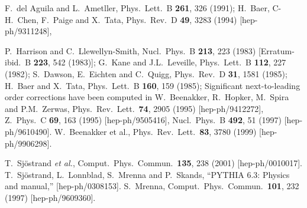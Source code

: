\documentclass[12pt]{article}
\begin{document}
\begin{thebibliography}{999}
F.~del Aguila and L.~Ametller,
  Phys.\ Lett.\ B {\bf 261}, 326 (1991);
H.~Baer, C-H.~Chen, F.~Paige and X.~Tata, 
  Phys.\ Rev.\ D {\bf 49}, 3283 (1994)
  [hep-ph/9311248],

P.~Harrison and C.~Llewellyn-Smith,
  Nucl.\ Phys.\ B {\bf 213}, 223 (1983)
  [Erratum-ibid.\ B {\bf 223}, 542 (1983)];
G.~Kane and J.L.~Leveille,
  Phys.\ Lett.\ B {\bf 112}, 227 (1982);
S.~Dawson, E.~Eichten and C.~Quigg,
  Phys.\ Rev.\ D {\bf 31}, 1581 (1985);
H.~Baer and X.~Tata, 
  Phys.\ Lett.\ B {\bf 160}, 159 (1985);
Significant next-to-leading order corrections have been computed in 
W.~Beenakker, R.~Hopker, M.~Spira and P.M.~Zerwas,
  Phys.\ Rev.\ Lett.\  {\bf 74}, 2905 (1995)
  [hep-ph/9412272],
  Z.\ Phys.\ C {\bf 69}, 163 (1995)
  [hep-ph/9505416],
  Nucl.\ Phys.\ B {\bf 492}, 51 (1997)
  [hep-ph/9610490].
W.~Beenakker et al.,
  Phys.\ Rev.\ Lett.\  {\bf 83}, 3780 (1999)
  [hep-ph/9906298].

T.~Sj\"ostrand {\em et al.}, 
  Comput.\ Phys.\ Commun.\  {\bf 135}, 238 (2001)
  [hep-ph/0010017].
T.~Sj\"ostrand, L.~Lonnblad, S.~Mrenna and P.~Skands,
  ``PYTHIA 6.3: Physics and manual,''
  [hep-ph/0308153].
S.~Mrenna,
  Comput.\ Phys.\ Commun.\  {\bf 101}, 232 (1997)
  [hep-ph/9609360].


\end{thebibliography}
\end{document}

